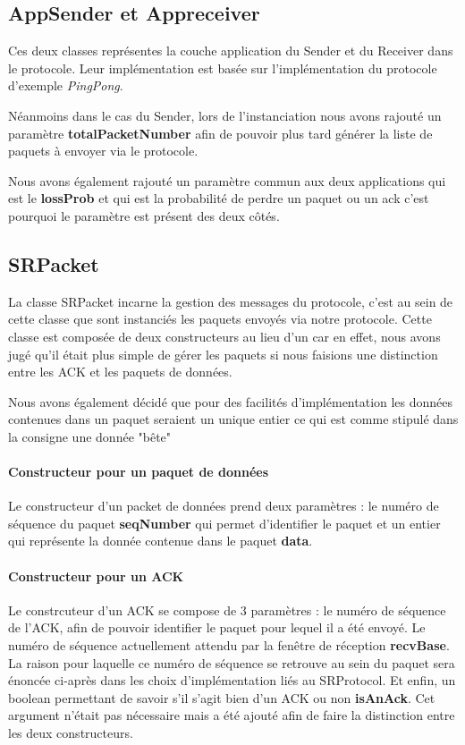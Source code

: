 \documentclass[../rapport.tex]{subfiles}
\begin{document}
\subsection{AppSender et Appreceiver}

	Ces deux classes représentes la couche application du Sender et du Receiver dans le 
	protocole. Leur implémentation est basée sur l'implémentation du protocole d'exemple 
	\textit{PingPong}. 

	\medskip

	Néanmoins dans le cas du Sender, lors de l'instanciation nous avons rajouté
	un paramètre \textbf{totalPacketNumber} afin de pouvoir plus tard générer la liste
	de paquets à envoyer via le protocole. 

	\medskip
	Nous avons également rajouté un paramètre commun aux deux applications qui est le 
	\textbf{lossProb} et qui est la probabilité de perdre un paquet ou un ack c'est pourquoi le
	paramètre est présent des deux côtés. 


\subsection{SRPacket}

	La classe SRPacket incarne la gestion des messages du protocole, c'est au sein de cette 
	classe que sont instanciés les paquets envoyés via notre protocole. Cette classe est
	composée de deux constructeurs au lieu d'un car en effet, nous avons jugé qu'il était
	plus simple de gérer les paquets si nous faisions une distinction entre les ACK et les
	paquets de données. 

	\medskip
	Nous avons également décidé que pour des facilités d'implémentation
	les données contenues dans un paquet seraient un unique entier ce qui est comme stipulé
	dans la consigne une donnée "bête"

	\medskip

	\paragraph{Constructeur pour un paquet de données}
	Le constructeur d'un packet de données prend deux paramètres : le numéro de séquence du
	paquet \textbf{seqNumber} qui permet d'identifier le paquet et un entier qui représente
	la donnée contenue dans le paquet \textbf{data}.

	\paragraph{Constructeur pour un ACK}
	Le constrcuteur d'un ACK se compose de 3 paramètres : le numéro de séquence de l'ACK, afin
	de pouvoir identifier le paquet pour lequel il a été envoyé. Le numéro de séquence
	actuellement attendu par la fenêtre de réception \textbf{recvBase}. La raison pour laquelle
	ce numéro de séquence se retrouve au sein du paquet sera énoncée ci-après dans les choix
	d'implémentation liés au SRProtocol. Et enfin, un boolean permettant de savoir s'il s'agit
	bien d'un ACK ou non \textbf{isAnAck}.
	Cet argument n'était pas nécessaire mais a été ajouté afin de faire la distinction entre
	les deux constructeurs.
\end{document}
